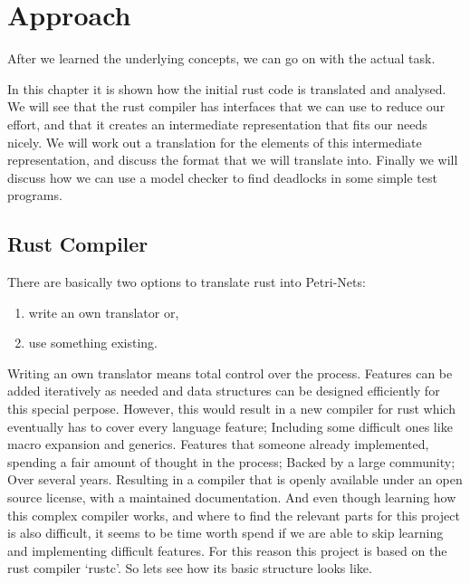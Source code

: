 

\chapter{Approach}
After we learned the underlying concepts, we can go on with the actual task.

In this chapter it is shown how the initial rust code is translated and analysed.
We will see that the rust compiler has interfaces that we can use to reduce our effort,
and that it creates an intermediate representation that fits our needs nicely.
We will work out a translation for the elements of this intermediate representation, 
and discuss the format that we will translate into.
Finally we will discuss how we can use a model checker to find deadlocks in some simple test programs.

\section{Rust Compiler}
\label{app_rust}
There are basically two options to translate rust into Petri-Nets:
\begin{enumerate}
    \item write an own translator or,
    \item use something existing.
\end{enumerate}
Writing an own translator means total control over the process.
Features can be added iteratively as needed and data structures can be designed efficiently for this special perpose.
However, this would result in a new compiler for rust which eventually has to cover every language feature;
Including some difficult ones like macro expansion and generics.
Features that someone already implemented, spending a fair amount of thought in the process;
Backed by a large community;
Over several years.
Resulting in a compiler that is openly available under an open source license\cite{rustc}, with a maintained documentation\cite{rustc-guide}\cite{rustc-doc}.
And even though learning how this complex compiler works, and where to find the relevant parts for this project is also difficult, it seems to be time worth spend if we are able to skip learning and implementing difficult features.
For this reason this project is based on the rust compiler `rustc'.
So lets see how its basic structure looks like.

